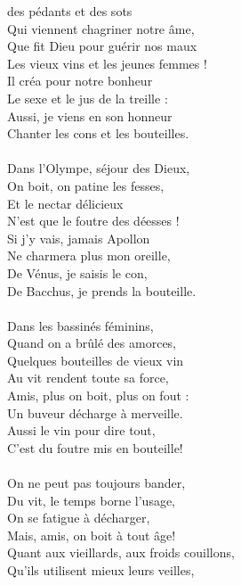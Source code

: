 
 des pédants et des sots
\\Qui viennent chagriner notre âme,
\\Que fit Dieu pour guérir nos maux
\\Les vieux vins et les jeunes femmes !
\\Il créa pour notre bonheur
\\Le sexe et le jus de la treille :
\\Aussi, je viens en son honneur
\\Chanter les cons et les bouteilles. \bissimple
\\\\Dans l'Olympe, séjour des Dieux,
\\On boit, on patine les fesses,
\\Et le nectar délicieux
\\N'est que le foutre des déesses !
\\Si j'y vais, jamais Apollon
\\Ne charmera plus mon oreille,
\\De Vénus, je saisis le con,
\\De Bacchus, je prends la bouteille. \bissimple
\\\\Dans les bassinés féminins,
\\Quand on a brûlé des amorces,
\\Quelques bouteilles de vieux vin
\\Au vit rendent toute sa force,
\\Amis, plus on boit, plus on fout :
\\Un buveur décharge à merveille.
\\Aussi le vin pour dire tout,
\\C'est du foutre mis en bouteille! \bissimple
\\\\On ne peut pas toujours bander,
\\Du vit, le temps borne l'usage,
\\On se fatigue à décharger,
\\Mais, amis, on boit à tout âge!
\\Quant aux vieillards, aux froids couillons,
\\Qu'ils utilisent mieux leurs veilles,

